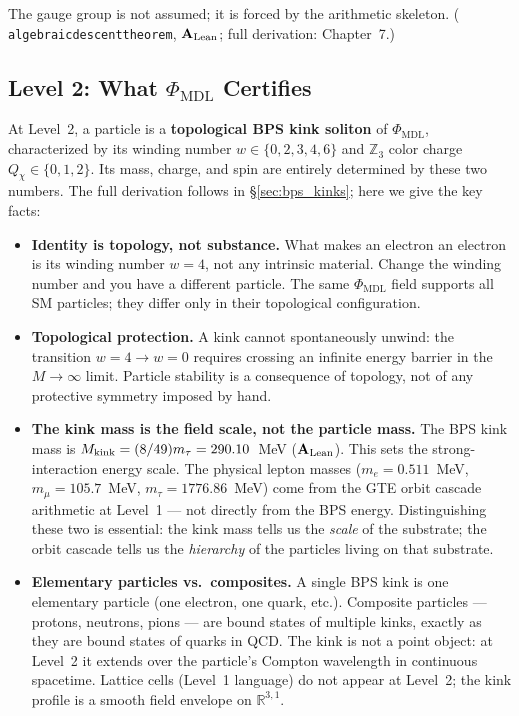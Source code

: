 \documentclass[11pt,openany]{book}
\theoremstyle{remark}
\newcommand{\PHIMDL}{\Phi_{\mathrm{MDL}}}
\newcommand{\lean}[1]{%
  \penalty-100
  \begingroup\def\_{\textunderscore\allowbreak}\texttt{#1}\endgroup}
\newcommand{\Mkink}{M_{\rm kink}}
\newcommand{\CatAL}{\ensuremath{\textbf{A}_{\rm Lean}}}
\begin{document}
The gauge group is not assumed; it is forced by the arithmetic skeleton.
(\lean{algebraic\_descent\_theorem}, \CatAL; full derivation: Chapter~7.)

\subsection*{Level 2: What $\PHIMDL$ Certifies}

At Level~2, a particle is a \textbf{topological BPS kink soliton} of $\PHIMDL$,
characterized by its winding number $w\in\{0,2,3,4,6\}$ and $\mathbb{Z}_3$ color
charge $Q_\chi\in\{0,1,2\}$.
Its mass, charge, and spin are entirely determined by these two numbers.
The full derivation follows in \S\ref{sec:bps_kinks}; here we give the key facts:

\begin{itemize}[itemsep=4pt]
\item \textbf{Identity is topology, not substance.}
  What makes an electron an electron is its winding number $w=4$, not any
  intrinsic material.
  Change the winding number and you have a different particle.
  The same $\PHIMDL$ field supports all SM particles; they differ only in
  their topological configuration.

\item \textbf{Topological protection.}
  A kink cannot spontaneously unwind: the transition $w=4\to w=0$ requires
  crossing an infinite energy barrier in the $M\to\infty$ limit.
  Particle stability is a consequence of topology, not of any protective symmetry
  imposed by hand.

\item \textbf{The kink mass is the field scale, not the particle mass.}
  The BPS kink mass is $\Mkink = (8/49)m_\tau = 290.10$~MeV (\CatAL).
  This sets the strong-interaction energy scale.
  The physical lepton masses ($m_e = 0.511$~MeV, $m_\mu = 105.7$~MeV,
  $m_\tau = 1776.86$~MeV) come from the GTE orbit cascade arithmetic at
  Level~1 --- not directly from the BPS energy.
  Distinguishing these two is essential: the kink mass tells us the
  \emph{scale} of the substrate; the orbit cascade tells us the
  \emph{hierarchy} of the particles living on that substrate.

\item \textbf{Elementary particles vs.\ composites.}
  A single BPS kink is one elementary particle (one electron, one quark, etc.).
  Composite particles --- protons, neutrons, pions --- are bound states of multiple
  kinks, exactly as they are bound states of quarks in QCD.
  The kink is not a point object: at Level~2 it extends over the particle's Compton
  wavelength in continuous spacetime.
  Lattice cells (Level~1 language) do not appear at Level~2; the kink profile is
  a smooth field envelope on $\mathbb{R}^{3,1}$.
\end{itemize}
\end{document}

